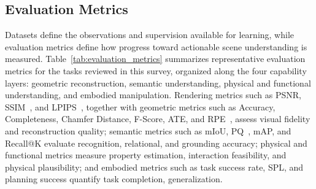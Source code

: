 \documentclass{SCIS2026}
\begin{document}
\subsection{Evaluation Metrics}
\label{subsec:evaluation_metrics}
Datasets define the observations and supervision available for learning, while evaluation metrics define how progress toward actionable scene understanding is measured. Table~\ref{tab:evaluation_metrics} summarizes representative evaluation metrics for the tasks reviewed in this survey, organized along the four capability layers: geometric reconstruction, semantic understanding, physical and functional understanding, and embodied manipulation. Rendering metrics such as PSNR, SSIM~\cite{wang2004image}, and LPIPS~\cite{zhang2018perceptual}, together with geometric metrics such as Accuracy, Completeness, Chamfer Distance, F-Score, ATE, and RPE~\cite{sturm2012benchmark}, assess visual fidelity and reconstruction quality; semantic metrics such as mIoU, PQ~\cite{kirillov2019panoptic}, mAP, and Recall@K evaluate recognition, relational, and grounding accuracy; physical and functional metrics measure property estimation, interaction feasibility, and physical plausibility; and embodied metrics such as task success rate, SPL, and planning success quantify task completion, generalization.
\end{document}
